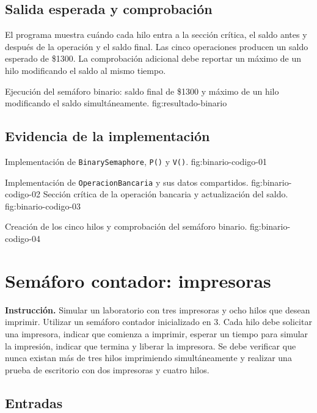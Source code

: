 \documentclass[12pt,oneside]{template/liverpoolthesis}
\begin{document}
\section{Salida esperada y comprobación}

El programa muestra cuándo cada hilo entra a la sección crítica, el saldo antes
y después de la operación y el saldo final. Las cinco operaciones producen un
saldo esperado de \$1300. La comprobación adicional debe reportar un máximo de
un hilo modificando el saldo al mismo tiempo.

  {Ejecución del semáforo binario: saldo final de \$1300 y máximo de un hilo
   modificando el saldo simultáneamente.}
  {fig:resultado-binario}

\section{Evidencia de la implementación}

  {Implementación de \texttt{BinarySemaphore}, \texttt{P()} y \texttt{V()}.}
  {fig:binario-codigo-01}

  {Implementación de \texttt{OperacionBancaria} y sus datos compartidos.}
  {fig:binario-codigo-02}
\vspace{-.5cm}
  {Sección crítica de la operación bancaria y actualización del saldo.}
  {fig:binario-codigo-03}

  {Creación de los cinco hilos y comprobación del semáforo binario.}
  {fig:binario-codigo-04}

\chapter{Semáforo contador: impresoras}

\textbf{Instrucción.} Simular un laboratorio con tres impresoras y ocho hilos
que desean imprimir. Utilizar un semáforo contador inicializado en 3. Cada hilo
debe solicitar una impresora, indicar que comienza a imprimir, esperar un
tiempo para simular la impresión, indicar que termina y liberar la impresora.
Se debe verificar que nunca existan más de tres hilos imprimiendo
simultáneamente y realizar una prueba de escritorio con dos impresoras y cuatro
hilos.

\section{Entradas}
\end{document}
